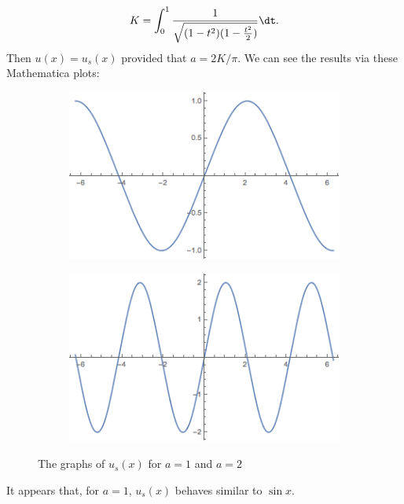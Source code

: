 \documentclass{hw}
\begin{document}
\[
K=\int_{0}^{1}{1\over\sqrt{(1-t^2)(1-{t^2\over2})}}\dt.
\]
Then $u(x)=u_{s}(x)$ provided that $a=2K/\pi$. We can see the results via these Mathematica plots:
\begin{figure}[h]
\centering
\begin{subfigure}{0.45\textwidth}
\includegraphics[scale=0.5]{u_of_1_x}
\end{subfigure}
\hfill
\begin{subfigure}{0.45\textwidth}
\includegraphics[scale=0.5]{u_of_2_x}
\end{subfigure}
\caption{The graphs of $u_{s}(x)$ for $a=1$ and $a=2$}
\end{figure}

\noindent It appears that, for $a=1$, $u_{s}(x)$ behaves similar to $\sin{x}$.
\end{document}

